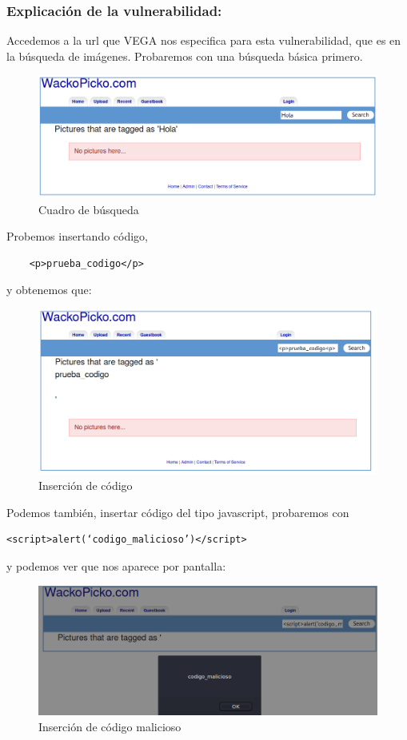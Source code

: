 \documentclass[12pt,twoside]{article}
\begin{document}
\subsubsection*{Explicación de la vulnerabilidad:}
Accedemos a la url que VEGA nos especifica para esta vulnerabilidad, que es en la búsqueda de imágenes. Probaremos con una búsqueda básica primero.
\begin{figure}[H]
    \centering
    \includegraphics[scale=0.35]{./imagenes/cuadro_busqueda_hola}
    \caption{Cuadro de búsqueda}
\end{figure}
Probemos insertando código, 
\begin{verbatim}
    <p>prueba_codigo</p>
\end{verbatim} 
y obtenemos que:
\begin{figure}[H]
    \centering
    \includegraphics[scale=0.35]{./imagenes/cuadro_busqueda_prueba_codigo}
    \caption{Inserción de código}
\end{figure}
Podemos también, insertar código del tipo javascript, probaremos con
\begin{verbatim}
<script>alert(‘codigo_malicioso’)</script>
\end{verbatim}
y podemos ver que nos aparece por pantalla:
\begin{figure}[H]
    \centering
    \includegraphics[scale=0.35]{./imagenes/cuadro_busqueda_prueba_codigo_malicioso}
    \caption{Inserción de código malicioso}
\end{figure}
\end{document}
